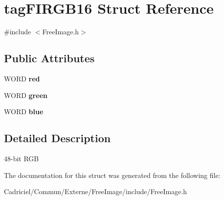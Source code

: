 \hypertarget{structtag_f_i_r_g_b16}{}\section{tag\+F\+I\+R\+G\+B16 Struct Reference}
\label{structtag_f_i_r_g_b16}


{\ttfamily \#include $<$Free\+Image.\+h$>$}

\subsection*{Public Attributes}
\begin{DoxyCompactItemize}
\item 
W\+O\+RD {\bfseries red}\hypertarget{structtag_f_i_r_g_b16_aeaa2393246d6482c02cac30d169ee022}{}\label{structtag_f_i_r_g_b16_aeaa2393246d6482c02cac30d169ee022}

\item 
W\+O\+RD {\bfseries green}\hypertarget{structtag_f_i_r_g_b16_a00e213246943f0a47698fdd0d51f9924}{}\label{structtag_f_i_r_g_b16_a00e213246943f0a47698fdd0d51f9924}

\item 
W\+O\+RD {\bfseries blue}\hypertarget{structtag_f_i_r_g_b16_ae9de217a4d3c01c533bc8e727c0ec0eb}{}\label{structtag_f_i_r_g_b16_ae9de217a4d3c01c533bc8e727c0ec0eb}

\end{DoxyCompactItemize}


\subsection{Detailed Description}
48-\/bit R\+GB 

The documentation for this struct was generated from the following file\+:\begin{DoxyCompactItemize}
\item 
Cadriciel/\+Commun/\+Externe/\+Free\+Image/include/Free\+Image.\+h\end{DoxyCompactItemize}
